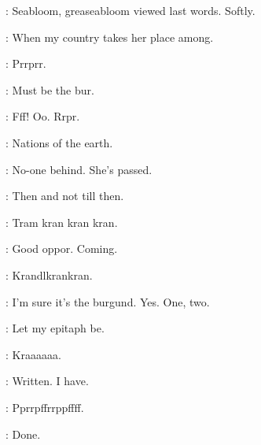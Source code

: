:
Seabloom,
greaseabloom viewed last words.
Softly.

\emmet:
When my country takes her place among.

:
Prrprr.

\BloomInt:
Must be the bur.

:
Fff!
Oo.
Rrpr.

\emmet:
Nations of the earth.

\BloomInt:
No-one behind.
She's passed.

\emmet:
Then and not till then.

:
Tram kran kran kran.

\BloomInt:
Good oppor.
Coming.

:
Krandlkrankran.

\BloomInt:
I'm sure it's the burgund.
Yes.
One,
two.

\emmet:
Let my epitaph be.

:
Kraaaaaa.

\emmet:
Written.
I have.

:
Pprrpffrrppffff.

\emmet:
Done.

